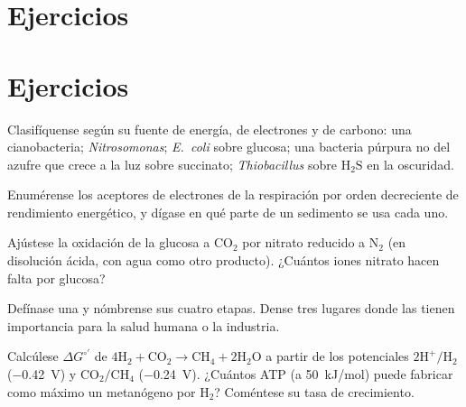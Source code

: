 \section{Ejercicios}
\section{Ejercicios}

\begin{exercise}[$\star$]\label{exo:b2:microbial-metabolism:1}
Clasifíquense según su fuente de energía, de electrones y de carbono: una
cianobacteria; \emph{Nitrosomonas}; \emph{E.~coli} sobre glucosa; una
bacteria púrpura no del azufre que crece a la luz sobre succinato;
\emph{Thiobacillus} sobre $\mathrm{H_2S}$ en la oscuridad.
\end{exercise}

\begin{exercise}[$\star$]\label{exo:b2:microbial-metabolism:2}
Enumérense los aceptores de electrones de la respiración por orden
decreciente de rendimiento energético, y dígase en qué parte de un
sedimento se usa cada uno.
\end{exercise}

\begin{exercise}[$\star$]\label{exo:b2:microbial-metabolism:3}
Ajústese la oxidación de la glucosa a $\mathrm{CO_2}$ por nitrato
reducido a $\mathrm{N_2}$ (en disolución ácida, con agua como otro
producto). ¿Cuántos iones nitrato hacen falta por glucosa?
\end{exercise}

\begin{exercise}[$\star$]\label{exo:b2:microbial-metabolism:4}
Defínase una  y nómbrense sus cuatro etapas. Dense tres
lugares donde las  tienen importancia para la salud humana o
la industria.
\end{exercise}

\begin{exercise}[$\star\star$]\label{exo:b2:microbial-metabolism:5}
Calcúlese $\Delta G^{\circ\prime}$ de $4\mathrm{H_2} + \mathrm{CO_2}
\to \mathrm{CH_4} + 2\mathrm{H_2O}$ a partir de los potenciales
$\mathrm{2H^+/H_2}$ (\qty{-0.42}{V}) y $\mathrm{CO_2/CH_4}$
(\qty{-0.24}{V}). ¿Cuántos ATP (a \qty{50}{kJ/mol}) puede fabricar como
máximo un metanógeno por $\mathrm{H_2}$? Coméntese su tasa de
crecimiento.
\end{exercise}

